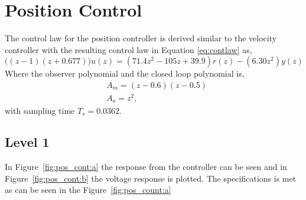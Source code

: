 \documentclass[12pt,a4paper]{article}
\begin{document}
\section*{Position Control}
  The control law for the position controller is derived similar to the
  velocity controller with the resulting control law in Equation
  \ref{eq:contlaw} as,
  \begin{equation}
      \big((z-1)(z+0.677))u(z)=(71.4z^2-105z+39.9)r(z)-(6.30z^2)y(z)
  \end{equation}
  Where the observer polynomial and the closed loop polynomial is,
  \begin{align*}
        &A_m = (z-0.6)(z-0.5)\\
        &A_o = z^2,
  \end{align*}
  with sampling time $T_s=0.0362$.
  \subsection*{Level 1} 
  In Figure~\ref{fig:pos_cont:a} the response from
  the controller can be seen and in Figure~\ref{fig:pos_cont:b} the
  voltage response is plotted. The specifications is met as can be seen
  in the Figure~\ref{fig:pos_count:a}
\end{document}
